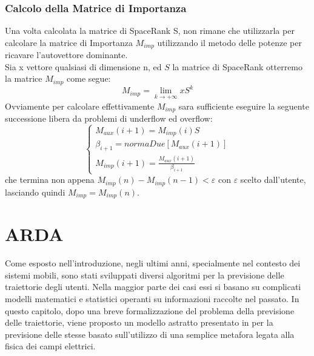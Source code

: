 \subsubsection{Calcolo della Matrice di Importanza}
Una volta calcolata la matrice di SpaceRank S, non rimane che utilizzarla per
calcolare la matrice di Importanza $M_{imp}$ utilizzando il metodo delle potenze
per ricavare l'autovettore dominante.\\
Sia x vettore qualsiasi di dimensione n, ed $S$ la matrice di SpaceRank otterremo
la matrice $M_{imp}$ come segue:
\begin{equation}
M_{imp} = \lim_{k \rightarrow +\infty} x S^{k}
\end{equation}
Ovviamente per calcolare effettivamente $M_{imp}$ sara sufficiente eseguire la seguente
successione libera da problemi di underflow ed overflow:
\begin{equation}
\left\{\begin{matrix}
M_{aux}(i+1) = M_{imp}(i)S
\\ \beta_{i+1} = normaDue[M_{aux}(i+1)]
\\ M_{imp}(i+1) = \frac{M_{aux}(i+1)}{\beta_{i+1}}
\end{matrix}\right.
\end{equation}
che termina non appena $ M_{imp}(n) - M_{imp}(n- 1) < \varepsilon $ con $ \varepsilon $ scelto dall'utente,
lasciando quindi $ M_{imp} = M_{imp}(n) $.

\section{ARDA}
Come esposto nell'introduzione, negli ultimi anni, specialmente nel contesto dei
sistemi mobili, sono stati sviluppati diversi algoritmi per la previsione delle
traiettorie degli utenti. Nella maggior parte dei casi essi si basano su complicati
modelli matematici e statistici operanti su informazioni raccolte nel passato. In
questo capitolo, dopo una breve formalizzazione del problema della previsione
delle traiettorie, viene proposto un modello astratto presentato in \cite{cit_49}
per la previsione delle stesse basato sull'utilizzo di una semplice metafora
legata alla fisica dei campi elettrici.

